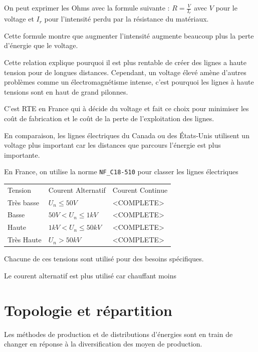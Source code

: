 On peut exprimer les Ohms avec la formule suivante : $R = \frac{V}{I_r}$
avec $V$ pour le voltage et $I_r$ pour l'intensité perdu par la résistance du matériaux.

Cette formule montre que augmenter l'intensité augmente beaucoup plus la perte d'énergie
que le voltage.

Cette relation explique pourquoi il est plus rentable de créer des lignes a haute tension
pour de longues distances.
Cependant, un voltage élevé amène d'autres problèmes comme un électromagnétisme intense,
c'est pourquoi les lignes à haute tensions sont en haut de grand pilonnes.

C'est RTE en France qui à décide du voltage et fait ce choix pour minimiser les coût de
fabrication et le coût de la perte de l'exploitation des lignes.

En comparaison, les lignes électriques du Canada ou des États-Unis utilisent un voltage
plus important car les distances que parcours l'énergie est plus importante.

En France, on utilise la norme \texttt{NF\_C18-510} pour classer les lignes électriques


\begin{center}
  \begin{table}[h]
    \begin{tabular}{|l|l|l|}
      Tension    & Courent Alternatif     & Courent Continue \\
      Très basse & $U_n \leq 50V$         & <COMPLETE>       \\
      Basse      & $50V < U_n \leq 1kV$   & <COMPLETE>       \\
      Haute      & $1kV < U_n \leq 50kV$  & <COMPLETE>       \\
      Très Haute & $U_n > 50kV$           & <COMPLETE>       \\
    \end{tabular}
  \end{table}
\end{center}

Chacune de ces tensions sont utilisé pour des besoins spécifiques.

Le courent alternatif est plus utilisé car chauffant moins

\section{Topologie et répartition}

Les méthodes de production et de distributions d'énergies sont en train de changer en réponse
à la diversification des moyen de production.

